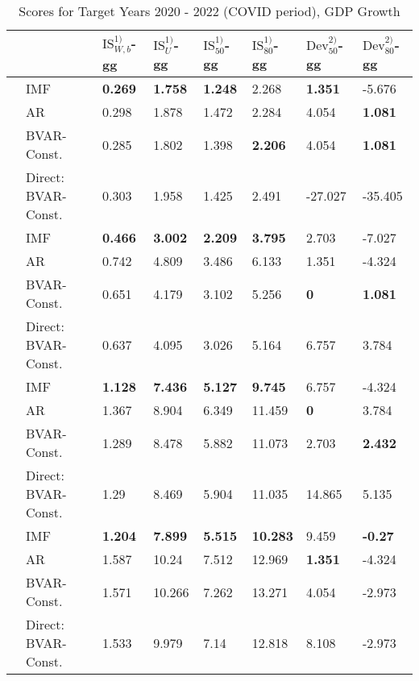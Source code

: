 \begin{table}[!h]
\centering
\caption{Scores for Target Years 2020 - 2022 (COVID period), GDP Growth}
\centering
\begin{tabular}[t]{llllllll}
\toprule
 &  & $\text{IS}_{W,b}^{1)}$-gg & $\text{IS}_{U}^{1)}$-gg & $\text{IS}_{50}^{1)}$-gg & $\text{IS}_{80}^{1)}$-gg & $\text{Dev}_{50}^{2)}$-gg & $\text{Dev}_{80}^{2)}$-gg\\
\midrule
 & IMF & \textbf{0.269} & \textbf{1.758} & \textbf{1.248} & 2.268 & \textbf{1.351} & -5.676\\
\parbox[t]{2mm}{}
 & AR & 0.298 & 1.878 & 1.472 & 2.284 & 4.054 & \textbf{1.081}\\
 & BVAR-Const. & 0.285 & 1.802 & 1.398 & \textbf{2.206} & 4.054 & \textbf{1.081}\\
 & Direct: BVAR-Const. & 0.303 & 1.958 & 1.425 & 2.491 & -27.027 & -35.405\\
\addlinespace
 & IMF & \textbf{0.466} & \textbf{3.002} & \textbf{2.209} & \textbf{3.795} & 2.703 & -7.027\\
\parbox[t]{2mm}{}
 & AR & 0.742 & 4.809 & 3.486 & 6.133 & 1.351 & -4.324\\
 & BVAR-Const. & 0.651 & 4.179 & 3.102 & 5.256 & \textbf{0} & \textbf{1.081}\\
 & Direct: BVAR-Const. & 0.637 & 4.095 & 3.026 & 5.164 & 6.757 & 3.784\\
\addlinespace
 & IMF & \textbf{1.128} & \textbf{7.436} & \textbf{5.127} & \textbf{9.745} & 6.757 & -4.324\\
\parbox[t]{2mm}{}
 & AR & 1.367 & 8.904 & 6.349 & 11.459 & \textbf{0} & 3.784\\
 & BVAR-Const. & 1.289 & 8.478 & 5.882 & 11.073 & 2.703 & \textbf{2.432}\\
 & Direct: BVAR-Const. & 1.29 & 8.469 & 5.904 & 11.035 & 14.865 & 5.135\\
\addlinespace
 & IMF & \textbf{1.204} & \textbf{7.899} & \textbf{5.515} & \textbf{10.283} & 9.459 & \textbf{-0.27}\\
\parbox[t]{2mm}{}
 & AR & 1.587 & 10.24 & 7.512 & 12.969 & \textbf{1.351} & -4.324\\
 & BVAR-Const. & 1.571 & 10.266 & 7.262 & 13.271 & 4.054 & -2.973\\
 & Direct: BVAR-Const. & 1.533 & 9.979 & 7.14 & 12.818 & 8.108 & -2.973\\
\bottomrule
\end{tabular}
\end{table}
